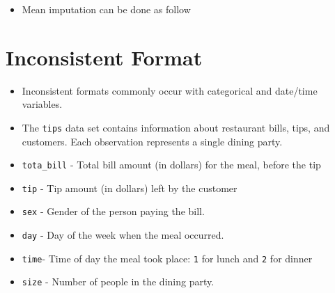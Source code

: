 \documentclass[
  letterpaper,
  DIV=11,
  numbers=noendperiod]{scrreprt}
\newenvironment{Shaded}{\begin{snugshade}}{\end{snugshade}}
\newcommand{\AttributeTok}[1]{\textcolor[rgb]{0.40,0.45,0.13}{#1}}
\newcommand{\CommentTok}[1]{\textcolor[rgb]{0.37,0.37,0.37}{#1}}
\newcommand{\ConstantTok}[1]{\textcolor[rgb]{0.56,0.35,0.01}{#1}}
\newcommand{\FunctionTok}[1]{\textcolor[rgb]{0.28,0.35,0.67}{#1}}
\newcommand{\NormalTok}[1]{\textcolor[rgb]{0.00,0.23,0.31}{#1}}
\newcommand{\OtherTok}[1]{\textcolor[rgb]{0.00,0.23,0.31}{#1}}
\newcommand{\SpecialCharTok}[1]{\textcolor[rgb]{0.37,0.37,0.37}{#1}}
\providecommand{\tightlist}{%
  \setlength{\itemsep}{0pt}\setlength{\parskip}{0pt}}\usepackage{longtable,booktabs,array}
\begin{document}
\begin{itemize}
\tightlist
\item
  Mean imputation can be done as follow
\end{itemize}

\begin{Shaded}
\end{Shaded}

\section{Inconsistent Format}\label{inconsistent-format}

\begin{itemize}
\item
  Inconsistent formats commonly occur with categorical and date/time
  variables.
\item
  The \texttt{tips} data set contains information about restaurant
  bills, tips, and customers. Each observation represents a single
  dining party.
\item
  \texttt{tota\_bill} - Total bill amount (in dollars) for the meal,
  before the tip
\item
  \texttt{tip} - Tip amount (in dollars) left by the customer
\item
  \texttt{sex} - Gender of the person paying the bill.
\item
  \texttt{day} - Day of the week when the meal occurred.
\item
  \texttt{time}- Time of day the meal took place: \texttt{1} for lunch
  and \texttt{2} for dinner
\item
  \texttt{size} - Number of people in the dining party.
\end{itemize}
\end{document}
